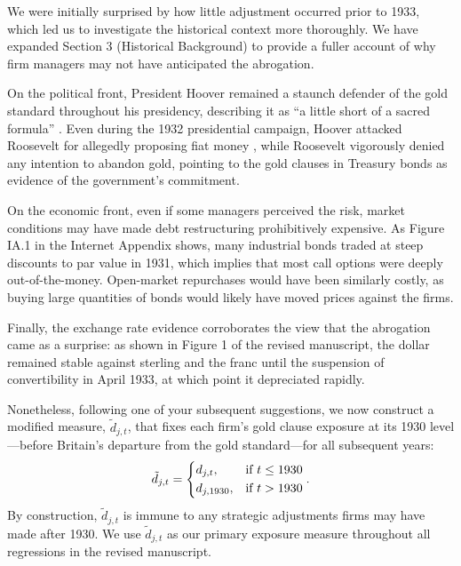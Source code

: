 We were initially surprised by how little adjustment occurred prior to 1933, which led us to investigate the historical context more thoroughly. We have expanded Section 3 (Historical Background) to provide a fuller account of why firm managers may not have anticipated the abrogation.

On the political front, President Hoover remained a staunch defender of the gold standard throughout his presidency, describing it as ``a little short of a sacred formula'' \citep{Eichengreen2000}. Even during the 1932 presidential campaign, Hoover attacked Roosevelt for allegedly proposing fiat money \citep{Edwards2018}, while Roosevelt vigorously denied any intention to abandon gold, pointing to the gold clauses in Treasury bonds as evidence of the government's commitment. 

On the economic front, even if some managers perceived the risk, market conditions may have made debt restructuring prohibitively expensive. As Figure IA.1 in the Internet Appendix shows, many industrial bonds traded at steep discounts to par value in 1931, which implies that most call options were deeply out-of-the-money. Open-market repurchases would have been similarly costly, as buying large quantities of bonds would likely have moved prices against the firms. 

Finally, the exchange rate evidence corroborates the view that the abrogation came as a surprise: as shown in Figure 1 of the revised manuscript, the dollar remained stable against sterling and the franc until the suspension of convertibility in April 1933, at which point it depreciated rapidly.

Nonetheless, following one of your subsequent suggestions, we now construct a modified measure, $\tilde{d}_{j,t}$, that fixes each firm's gold clause exposure at its 1930 level---before Britain's departure from the gold standard---for all subsequent years:
\begin{equation*}
\tilde{d}_{j,t} = \begin{dcases}
d_{j,t}, & \text{if } t \leq 1930 \\
d_{j,1930}, & \text{if } t > 1930
\end{dcases}.
\end{equation*}
By construction, $\tilde{d}_{j,t}$ is immune to any strategic adjustments firms may have made after 1930. We use $\tilde{d}_{j,t}$ as our primary exposure measure throughout all regressions in the revised manuscript.

\bigskip

